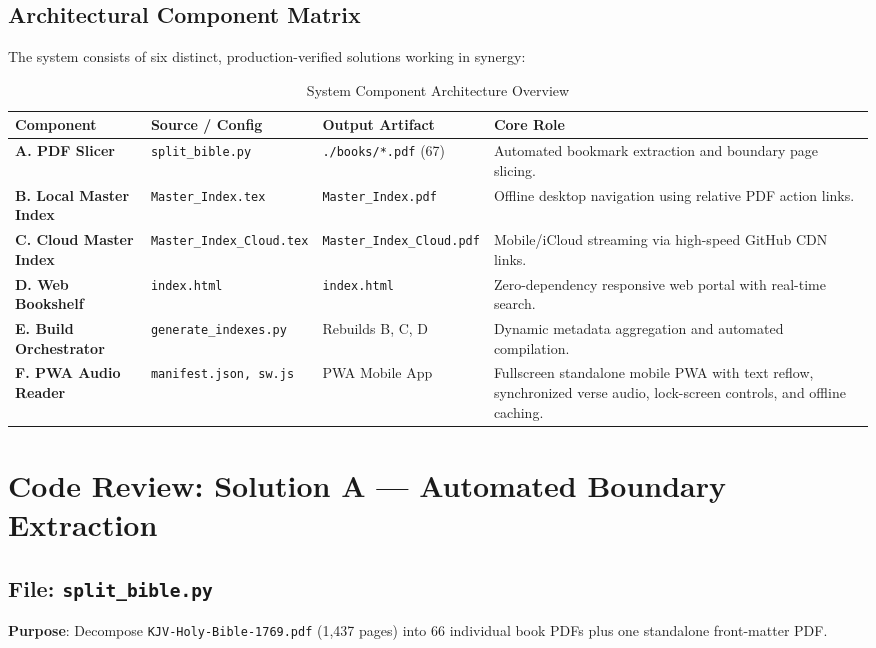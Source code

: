 \documentclass[11pt,letterpaper]{article}
\begin{document}
\subsection{Architectural Component Matrix}
The system consists of six distinct, production-verified solutions working in synergy:

\begin{table}[h!]
\centering
\small
\begin{tabularx}{\linewidth}{p{3.2cm} p{3.2cm} p{2.6cm} X}
\toprule
\textbf{Component} & \textbf{Source / Config} & \textbf{Output Artifact} & \textbf{Core Role} \\
\midrule
\textbf{A. PDF Slicer} & \texttt{split\_bible.py} & \texttt{./books/*.pdf} (67) & Automated bookmark extraction and boundary page slicing. \\
\textbf{B. Local Master Index} & \texttt{Master\_Index.tex} & \texttt{Master\_Index.pdf} & Offline desktop navigation using relative PDF action links. \\
\textbf{C. Cloud Master Index} & \texttt{Master\_Index\_Cloud.tex} & \texttt{Master\_Index\_Cloud.pdf} & Mobile/iCloud streaming via high-speed GitHub CDN links. \\
\textbf{D. Web Bookshelf} & \texttt{index.html} & \texttt{index.html} & Zero-dependency responsive web portal with real-time search. \\
\textbf{E. Build Orchestrator} & \texttt{generate\_indexes.py} & Rebuilds B, C, D & Dynamic metadata aggregation and automated compilation. \\
\textbf{F. PWA Audio Reader} & \texttt{manifest.json, sw.js} & PWA Mobile App & Fullscreen standalone mobile PWA with text reflow, synchronized verse audio, lock-screen controls, and offline caching. \\
\bottomrule
\end{tabularx}
\caption{System Component Architecture Overview}
\end{table}

\newpage
\section{Code Review: Solution A --- Automated Boundary Extraction}

\subsection{File: \texttt{split\_bible.py}}
\textbf{Purpose}: Decompose \texttt{KJV-Holy-Bible-1769.pdf} (1,437 pages) into 66 individual book PDFs plus one standalone front-matter PDF.
\end{document}
